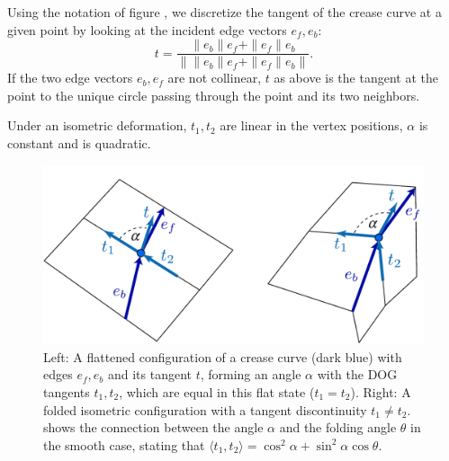 Using the notation of figure , we discretize the tangent of the crease curve at a given point by looking at the incident edge vectors $e_f, e_b$: 
\begin{equation} \label{eq:crease_tangent}
t = \frac{\|e_b\|e_f + \|e_f\|e_b}{\left\|\|e_b\|e_f + \|e_f\|e_b\right\|}.
\end{equation}
If the two edge vectors $e_b, e_f$ are not collinear, $t$ as above is the tangent at the point to the unique circle passing through the point and its two neighbors. 

Under an isometric deformation, $t_1,t_2$ are linear in the vertex positions, $\alpha$ is constant and   is quadratic.

\begin{figure} [h]
	\centering
	\includegraphics[width=0.8\linewidth]{figures/fold_angle_and_tangent_angles}
	\caption{Left: A flattened configuration of a crease curve (dark blue) with edges $e_f,e_b$ and its tangent $t$, forming an angle $\alpha$ with the DOG tangents $t_1,t_2$, which are equal in this flat state ($t_1=t_2$). Right: A folded isometric configuration with a tangent discontinuity  $t_1 \neq t_2$.  shows the connection between the angle $\alpha$ and the folding angle $\theta$ in the smooth case, stating that $\langle t_1, t_2 \rangle = \cos^2\!\alpha + \sin^2\!\alpha \cos\theta$. }
	\label{fig:fold_angle_and_tangent_angles}
\end{figure}

